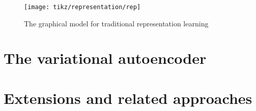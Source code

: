\begin{figure}[htp!]
    \centering
    \texttt{[image: tikz/representation/rep]}
    \caption{The graphical model for traditional representation learning}
    \label{fig:graphical-model-rep}
\end{figure}

\section{The variational autoencoder}

\section{Extensions and related approaches}
